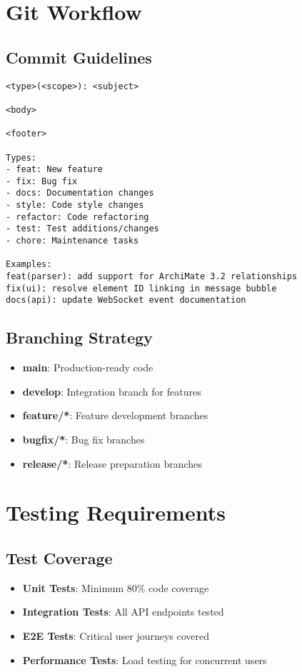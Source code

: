 \documentclass[12pt,a4paper]{report}
\begin{document}
\section{Git Workflow}

\subsection{Commit Guidelines}

\begin{lstlisting}[caption=Commit Message Format]
<type>(<scope>): <subject>

<body>

<footer>

Types:
- feat: New feature
- fix: Bug fix
- docs: Documentation changes
- style: Code style changes
- refactor: Code refactoring
- test: Test additions/changes
- chore: Maintenance tasks

Examples:
feat(parser): add support for ArchiMate 3.2 relationships
fix(ui): resolve element ID linking in message bubble
docs(api): update WebSocket event documentation
\end{lstlisting}

\subsection{Branching Strategy}

\begin{itemize}
    \item \textbf{main}: Production-ready code
    \item \textbf{develop}: Integration branch for features
    \item \textbf{feature/*}: Feature development branches
    \item \textbf{bugfix/*}: Bug fix branches
    \item \textbf{release/*}: Release preparation branches
\end{itemize}

\section{Testing Requirements}

\subsection{Test Coverage}

\begin{itemize}
    \item \textbf{Unit Tests}: Minimum 80\% code coverage
    \item \textbf{Integration Tests}: All API endpoints tested
    \item \textbf{E2E Tests}: Critical user journeys covered
    \item \textbf{Performance Tests}: Load testing for concurrent users
\end{itemize}
\end{document}
